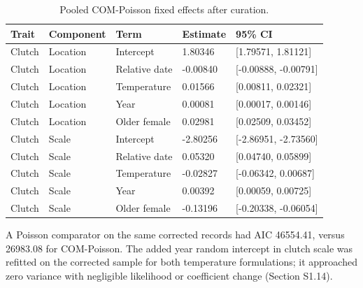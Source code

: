 \documentclass{article}
\begin{document}
\begin{table}[!ht]\centering\scriptsize\singlespacing
\caption{Pooled COM-Poisson fixed effects after curation.}\label{tab:count-coefficients}
\begin{tabular}{lllll}\toprule
Trait & Component & Term & Estimate & 95\% CI\\\midrule
Clutch & Location & Intercept & 1.80346 & [1.79571, 1.81121]\\
Clutch & Location & Relative date & -0.00840 & [-0.00888, -0.00791]\\
Clutch & Location & Temperature & 0.01566 & [0.00811, 0.02321]\\
Clutch & Location & Year & 0.00081 & [0.00017, 0.00146]\\
Clutch & Location & Older female & 0.02981 & [0.02509, 0.03452]\\
Clutch & Scale & Intercept & -2.80256 & [-2.86951, -2.73560]\\
Clutch & Scale & Relative date & 0.05320 & [0.04740, 0.05899]\\
Clutch & Scale & Temperature & -0.02827 & [-0.06342, 0.00687]\\
Clutch & Scale & Year & 0.00392 & [0.00059, 0.00725]\\
Clutch & Scale & Older female & -0.13196 & [-0.20338, -0.06054]\\
\bottomrule\end{tabular}\end{table}
A Poisson comparator on the same corrected records had AIC 46554.41, versus 26983.08 for COM-Poisson. The added year random intercept in clutch scale was refitted on the corrected sample for both temperature formulations; it approached zero variance with negligible likelihood or coefficient change (Section S1.14).
\end{document}
